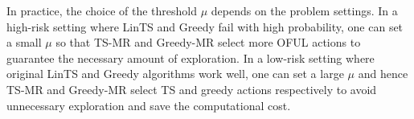 \begin{remark}
In practice, the choice of the threshold $\mu$ depends on the problem settings. In a high-risk setting where LinTS and Greedy fail with high probability, one can set a small $\mu$ so that  TS-MR and Greedy-MR select more OFUL actions to guarantee the necessary amount of exploration. In a low-risk setting where original LinTS and Greedy algorithms work well, one can set a large $\mu$ and hence  TS-MR and Greedy-MR select TS and greedy actions respectively to avoid unnecessary exploration and save the computational cost. 
\end{remark}








